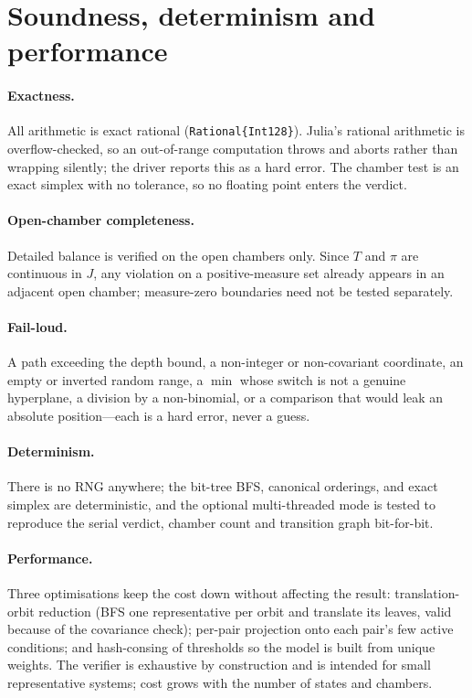 \documentclass[10pt]{article}
\newcommand{\code}[1]{\texttt{\small #1}}
\begin{document}
\section{Soundness, determinism and performance}
\paragraph{Exactness.} All arithmetic is exact rational
(\code{Rational\{Int128\}}). Julia's rational arithmetic is overflow-checked, so an
out-of-range computation throws and aborts rather than wrapping silently; the
driver reports this as a hard error. The chamber test is an exact simplex with no
tolerance, so no floating point enters the verdict.
\paragraph{Open-chamber completeness.} Detailed balance is verified on the open
chambers only. Since $T$ and $\pi$ are continuous in $J$, any violation on a
positive-measure set already appears in an adjacent open chamber; measure-zero
boundaries need not be tested separately.
\paragraph{Fail-loud.} A path exceeding the depth bound, a non-integer or
non-covariant coordinate, an empty or inverted random range, a $\min$ whose switch
is not a genuine hyperplane, a division by a non-binomial, or a comparison that
would leak an absolute position---each is a hard error, never a guess.
\paragraph{Determinism.} There is no RNG anywhere; the bit-tree BFS, canonical
orderings, and exact simplex are deterministic, and the optional multi-threaded
mode is tested to reproduce the serial verdict, chamber count and transition graph
bit-for-bit.
\paragraph{Performance.} Three optimisations keep the cost down without affecting
the result: translation-orbit reduction (BFS one representative per orbit and
translate its leaves, valid because of the covariance check); per-pair projection
onto each pair's few active conditions; and hash-consing of thresholds so the
model is built from unique weights. The verifier is exhaustive by construction and
is intended for small representative systems; cost grows with the number of states
and chambers.
\end{document}
